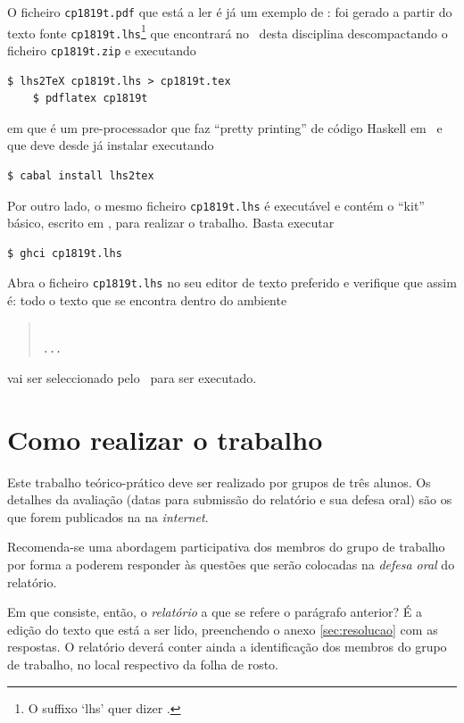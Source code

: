 \documentclass[a4paper]{article}
\begin{document}
O ficheiro \texttt{cp1819t.pdf} que está a ler é já um exemplo de : foi gerado a partir do texto fonte \texttt{cp1819t.lhs}\footnote{O
suffixo `lhs' quer dizer \emph{}.} que encontrará
no \MaterialPedagogico\ desta disciplina descompactando o ficheiro \texttt{cp1819t.zip}
e executando
\begin{Verbatim}[fontsize=\small]
    $ lhs2TeX cp1819t.lhs > cp1819t.tex
    $ pdflatex cp1819t
\end{Verbatim}
em que \href{https://hackage.haskell.org/package/lhs2tex}{\texttt\LhsToTeX} é
um pre-processador que faz ``pretty printing''
de código Haskell em \Latex\ e que deve desde já instalar executando
\begin{Verbatim}[fontsize=\small]
    $ cabal install lhs2tex
\end{Verbatim}
Por outro lado, o mesmo ficheiro \texttt{cp1819t.lhs} é executável e contém
o ``kit'' básico, escrito em \Haskell, para realizar o trabalho. Basta executar
\begin{Verbatim}[fontsize=\small]
    $ ghci cp1819t.lhs
\end{Verbatim}


\noindent Abra o ficheiro \texttt{cp1819t.lhs} no seu editor de texto preferido
e verifique que assim é: todo o texto que se encontra dentro do ambiente
\begin{quote}\small\tt
{}
\\ ... \\
\end{quote}
vai ser seleccionado pelo \GHCi\ para ser executado.

\section{Como realizar o trabalho}
Este trabalho teórico-prático deve ser realizado por grupos de três alunos.
Os detalhes da avaliação (datas para submissão do relatório e sua defesa
oral) são os que forem publicados na  na \emph{internet}.

Recomenda-se uma abordagem participativa dos membros do grupo
de trabalho por forma a poderem responder às questões que serão colocadas
na \emph{defesa oral} do relatório.

Em que consiste, então, o \emph{relatório} a que se refere o parágrafo anterior?
É a edição do texto que está a ser lido, preenchendo o anexo \ref{sec:resolucao}
com as respostas. O relatório deverá conter ainda a identificação dos membros
do grupo de trabalho, no local respectivo da folha de rosto.
\end{document}
